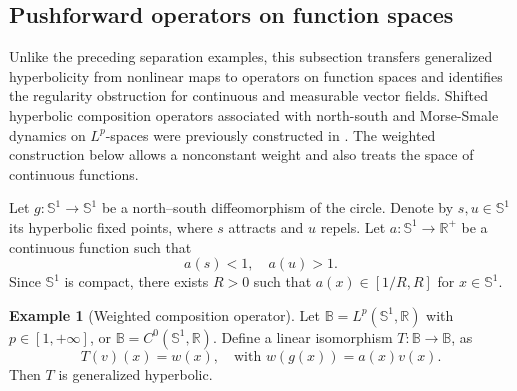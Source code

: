\documentclass[12pt]{article}
\newcommand{\Bb}{\mathbb{B}}
\newcommand{\Rr}{\mathbb{R}}
\theoremstyle{definition}
\newtheorem{example}[thm]{Example}
\begin{document}
\subsection{Pushforward operators on function spaces}

Unlike the preceding separation examples, this subsection transfers generalized hyperbolicity from nonlinear maps to operators on function spaces and identifies the regularity obstruction for continuous and measurable vector fields. Shifted hyperbolic composition operators associated with north-south and Morse-Smale dynamics on $L^p$-spaces were previously constructed in \cite[Section~3]{Puj21}. The weighted construction below allows a nonconstant weight and also treats the space of continuous functions.

Let $g:\mathbb{S}^1 \to \mathbb{S}^1$ be  a north–south diffeomorphism  of the circle. Denote by $s, u \in \mathbb{S}^1$ its hyperbolic fixed points, where $s$ attracts and $u$ repels.
Let $a: \mathbb{S}^1 \to \Rr^+$ be a continuous function such that 
\begin{equation}\label{eq:3-3-1}
    a(s) < 1, \quad a(u) > 1.
\end{equation}
Since $\mathbb{S}^1$ is compact, there exists $R> 0$ such that $a(x) \in [1/R, R]$ for $x \in \mathbb{S}^1$.
\begin{example}[Weighted composition operator]\label{ex:coh}
Let $\Bb = L^p(\mathbb{S}^1, \Rr)$ with $p \in [1, +\infty]$, or $\Bb = C^0(\mathbb{S}^1, \Rr)$. Define a linear isomorphism $T:\Bb \to \Bb$, as 
\begin{equation}\label{eq:3-3-T}
T(v)(x) = w(x), \quad \mbox{with $w(g(x)) = a(x)v(x)$}.
\end{equation}
Then $T$ is generalized hyperbolic.   
\end{example}
\end{document}
